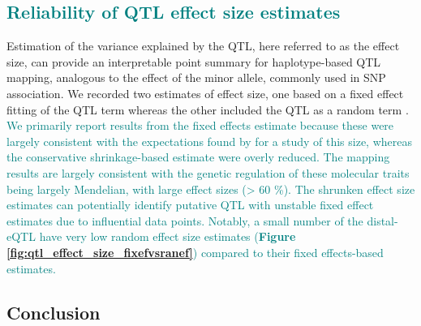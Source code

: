 \documentclass[9pt,twocolumn,twoside]{gsajnl}
\newcommand{\WV}[2]{\textcolor{red}{#1\footnote{\textcolor{red}{WV: #2}}}}
\newcommand{\GKinline}[1]{\textcolor{teal}{#1}}
\begin{document}
\subsection{\GKinline{Reliability of QTL effect size estimates}}


Estimation of the variance explained by the QTL, here referred to as the effect size, can provide an interpretable point summary for haplotype-based QTL mapping, analogous to the effect of the minor allele, commonly used in SNP association. We recorded two estimates of effect size, one based on a fixed effect fitting of the QTL term whereas the other included the QTL as a random term \citep{Wei2016}. 
\GKinline{We primarily report results from the fixed effects estimate because these were largely consistent with the expectations found by \cite{Keele2019} for a study of this size, whereas the conservative shrinkage-based estimate were overly reduced. The mapping results are largely consistent with the genetic regulation of these molecular traits being largely Mendelian, with large effect sizes (> 60 \%).}
\GKinline{The shrunken effect size estimates can potentially identify putative QTL with unstable fixed effect estimates due to influential data points. Notably, a small number of the distal-eQTL have very low random effect size estimates (\textbf{Figure \ref{fig:qtl_effect_size_fixefvsranef}}) compared to their fixed effects-based estimates.}

\subsection{Conclusion}
\end{document}
